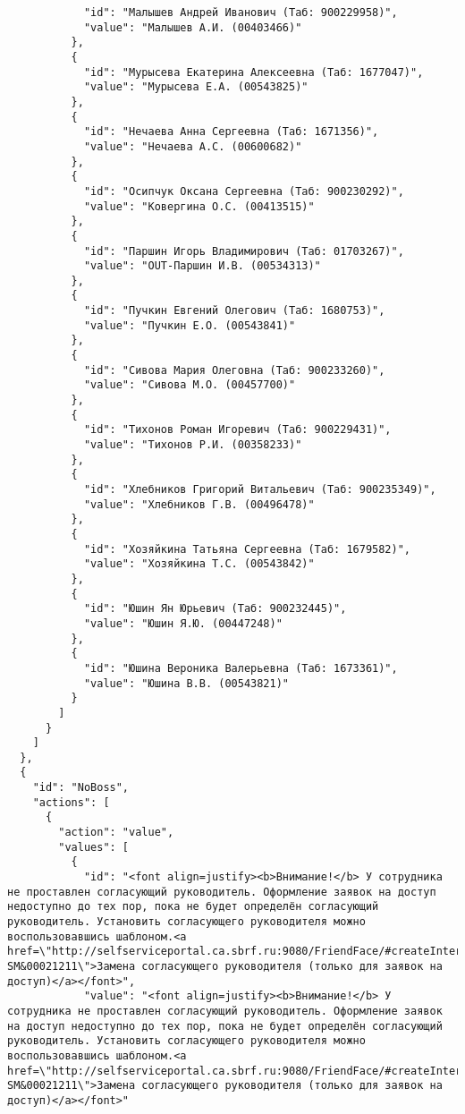 \begin{verbatim}
            "id": "Малышев Андрей Иванович (Таб: 900229958)",
            "value": "Малышев А.И. (00403466)"
          },
          {
            "id": "Мурысева Екатерина Алексеевна (Таб: 1677047)",
            "value": "Мурысева Е.А. (00543825)"
          },
          {
            "id": "Нечаева Анна Сергеевна (Таб: 1671356)",
            "value": "Нечаева А.С. (00600682)"
          },
          {
            "id": "Осипчук Оксана Сергеевна (Таб: 900230292)",
            "value": "Ковергина О.С. (00413515)"
          },
          {
            "id": "Паршин Игорь Владимирович (Таб: 01703267)",
            "value": "OUT-Паршин И.В. (00534313)"
          },
          {
            "id": "Пучкин Евгений Олегович (Таб: 1680753)",
            "value": "Пучкин Е.О. (00543841)"
          },
          {
            "id": "Сивова Мария Олеговна (Таб: 900233260)",
            "value": "Сивова М.О. (00457700)"
          },
          {
            "id": "Тихонов Роман Игоревич (Таб: 900229431)",
            "value": "Тихонов Р.И. (00358233)"
          },
          {
            "id": "Хлебников Григорий Витальевич (Таб: 900235349)",
            "value": "Хлебников Г.В. (00496478)"
          },
          {
            "id": "Хозяйкина Татьяна Сергеевна (Таб: 1679582)",
            "value": "Хозяйкина Т.С. (00543842)"
          },
          {
            "id": "Юшин Ян Юрьевич (Таб: 900232445)",
            "value": "Юшин Я.Ю. (00447248)"
          },
          {
            "id": "Юшина Вероника Валерьевна (Таб: 1673361)",
            "value": "Юшина В.В. (00543821)"
          }
        ]
      }
    ]
  },
  {
    "id": "NoBoss",
    "actions": [
      {
        "action": "value",
        "values": [
          {
            "id": "<font align=justify><b>Внимание!</b> У сотрудника не проставлен согласующий руководитель. Оформление заявок на доступ недоступно до тех пор, пока не будет определён согласующий руководитель. Установить согласующего руководителя можно воспользовавшись шаблоном.<a href=\"http://selfserviceportal.ca.sbrf.ru:9080/FriendFace/#createInteraction?SM&00021211\">Замена согласующего руководителя (только для заявок на доступ)</a></font>",
            "value": "<font align=justify><b>Внимание!</b> У сотрудника не проставлен согласующий руководитель. Оформление заявок на доступ недоступно до тех пор, пока не будет определён согласующий руководитель. Установить согласующего руководителя можно воспользовавшись шаблоном.<a href=\"http://selfserviceportal.ca.sbrf.ru:9080/FriendFace/#createInteraction?SM&00021211\">Замена согласующего руководителя (только для заявок на доступ)</a></font>"

\end{verbatim}
